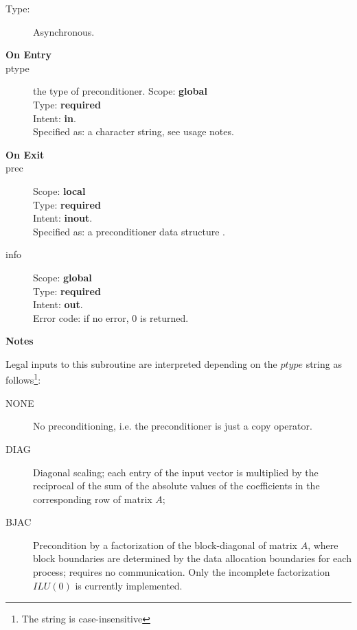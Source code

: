 \begin{description}
\item[Type:] Asynchronous.
\item[\bf On Entry]
\item[ptype] the type of preconditioner. 
Scope: {\bf global} \\
Type: {\bf required}\\
Intent: {\bf in}.\\
Specified as: a character string, see usage notes.
\item[\bf On Exit]

\item[prec] 
Scope: {\bf local} \\
Type: {\bf required}\\
Intent: {\bf inout}.\\
Specified as: a preconditioner data structure \precdata.
\item[info] 
Scope: {\bf global} \\
Type: {\bf required}\\
Intent: {\bf out}.\\
Error code: if no error, 0 is returned.
\end{description}
{\par\noindent\large\bfseries Notes}
Legal inputs to this subroutine are interpreted depending on the
$ptype$ string as follows\footnote{The string is case-insensitive}:
\begin{description}
\item[NONE] No preconditioning, i.e. the preconditioner is just a copy
  operator.
\item[DIAG] Diagonal scaling; each entry of the input vector is
  multiplied by the reciprocal of the sum of the absolute values of
  the coefficients in the corresponding row of matrix  $A$;
\item[BJAC] Precondition by a  factorization of the
  block-diagonal of matrix $A$, where block boundaries are determined
  by the data allocation boundaries for each process; requires no
  communication. Only the incomplete factorization $ILU(0)$ is
  currently implemented.  
\end{description}


